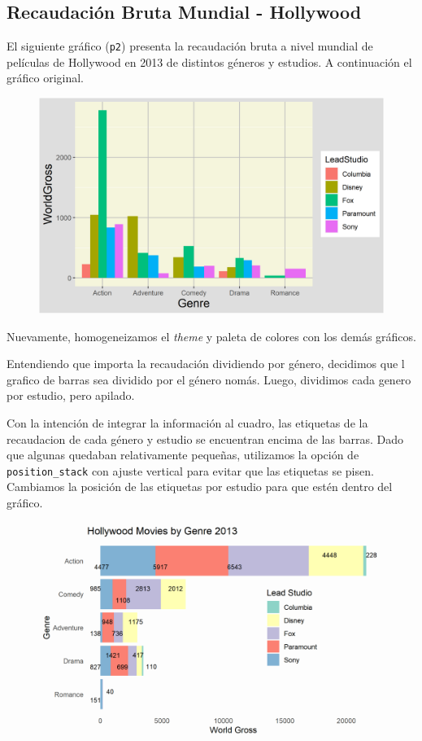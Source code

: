 \documentclass[9pt]{article}
\begin{document}
\subsection*{Recaudaci\'on Bruta Mundial - Hollywood}
El siguiente gr\'afico (\texttt{p2}) presenta la recaudaci\'on bruta a nivel mundial de pel\'iculas de Hollywood en 2013 de distintos g\'eneros y estudios. A continuaci\'on el gr\'afico original.
\begin{figure}[H]
    \centering
    \includegraphics{original1.png}
\end{figure}
Nuevamente, homogeneizamos el \textit{theme} y paleta de colores con los dem\'as gr\'aficos. 

Entendiendo que importa la recaudaci\'on dividiendo por g\'enero, decidimos que l grafico de barras sea dividido por el g\'enero nom\'as. Luego, dividimos cada genero por estudio, pero apilado.

Con la intenci\'on de integrar la informaci\'on al cuadro, las etiquetas de la recaudacion de cada g\'enero y estudio se encuentran encima de las barras. Dado que algunas quedaban relativamente peque\~nas, utilizamos la opci\'on de \texttt{position\_stack} con ajuste vertical para evitar que las etiquetas se pisen. Cambiamos la posici\'on de las etiquetas por estudio para que est\'en dentro del gr\'afico.
\begin{figure}[H]
    \centering
    \includegraphics{changed1.png}
\end{figure}
\end{document}
